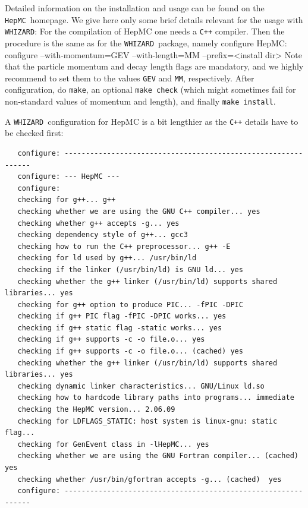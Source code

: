 \documentclass[12pt]{book}
\newenvironment{interaction}%
  {\begingroup\small
   \verbatim}%
  {\endverbatim
   \endgroup\noindent}
\newcommand{\ttt}[1]{\texttt{#1}}
\newcommand{\whizard}{\texttt{WHIZARD}}
\newcommand{\hepmc}{\texttt{HepMC}}
\begin{document}
Detailed information on the installation and usage can be found on the
\hepmc\ homepage. We give here only some brief details relevant for
the usage with \whizard: For the compilation of HepMC one needs a
\ttt{C++} compiler. Then the procedure is the same as for the
\whizard\ package, namely configure HepMC: 
\begin{interaction}
  configure --with-momentum=GEV --with-length=MM --prefix=<install dir> 
\end{interaction}
Note that the particle momentum and decay length flags are mandatory, and
we highly recommend to set them to the values \ttt{GEV} and \ttt{MM},
respectively. After configuration, do \ttt{make}, an optional
\ttt{make check} (which might sometimes fail for non-standard values
of momentum and length), and finally \ttt{make install}.

A \whizard\ configuration for HepMC is a bit lengthier as the
\ttt{C++} details have to be checked first:
\begin{footnotesize}
  \begin{verbatim}
   configure: --------------------------------------------------------------
   configure: --- HepMC ---
   configure:
   checking for g++... g++
   checking whether we are using the GNU C++ compiler... yes
   checking whether g++ accepts -g... yes
   checking dependency style of g++... gcc3
   checking how to run the C++ preprocessor... g++ -E
   checking for ld used by g++... /usr/bin/ld
   checking if the linker (/usr/bin/ld) is GNU ld... yes
   checking whether the g++ linker (/usr/bin/ld) supports shared libraries... yes
   checking for g++ option to produce PIC... -fPIC -DPIC
   checking if g++ PIC flag -fPIC -DPIC works... yes
   checking if g++ static flag -static works... yes
   checking if g++ supports -c -o file.o... yes
   checking if g++ supports -c -o file.o... (cached) yes
   checking whether the g++ linker (/usr/bin/ld) supports shared libraries... yes
   checking dynamic linker characteristics... GNU/Linux ld.so
   checking how to hardcode library paths into programs... immediate
   checking the HepMC version... 2.06.09
   checking for LDFLAGS_STATIC: host system is linux-gnu: static flag...
   checking for GenEvent class in -lHepMC... yes
   checking whether we are using the GNU Fortran compiler... (cached) yes
   checking whether /usr/bin/gfortran accepts -g... (cached)  yes
   configure: --------------------------------------------------------------    
  \end{verbatim}
\end{footnotesize}
\end{document}
